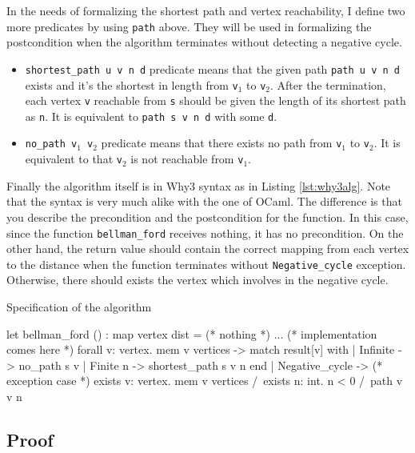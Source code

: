 \documentclass[a4paper,12pt]{article}
\begin{document}
In the needs of formalizing the shortest path and vertex reachability,
I define two more predicates by using \texttt{path} above. They will
be used in formalizing the postcondition when the algorithm terminates
without detecting a negative cycle.

\begin{itemize}

\item \texttt{shortest\_path u v n d} predicate means that the given
  path \texttt{path u v n d} exists and it's the shortest in length
  from \texttt{v$_1$} to \texttt{v$_2$}. After the termination, each
  vertex \texttt{v} reachable from \texttt{s} should be given the
  length of its shortest path as \texttt{n}. It is equivalent to
  \texttt{path s v n d} with some \texttt{d}.

\item \texttt{no\_path v$_1$ v$_2$} predicate means that there exists
  no path from \texttt{v$_1$} to \texttt{v$_2$}. It is equivalent to
  that \texttt{v$_2$} is not reachable from \texttt{v$_1$}.

\end{itemize}

Finally the algorithm itself is in Why3 syntax as in Listing
\ref{lst:why3alg}. Note that the syntax is very much alike with the
one of OCaml. The difference is that you describe the precondition and
the postcondition for the function. In this case, since the function
\texttt{bellman\_ford} receives nothing, it has no precondition. On
the other hand, the return value should contain the correct mapping
from each vertex to the distance when the function terminates without
\texttt{Negative\_cycle} exception. Otherwise, there should exists the
vertex which involves in the negative cycle.

\begin{algorithm}
\caption{Specification of the algorithm}\label{lst:why3alg}
\begin{why3}
let bellman_ford () : map vertex dist =
  { (* nothing *) }
  ... (* implementation comes here *)
  { forall v: vertex. mem v vertices ->
    match result[v] with
    | Infinite -> no_path s v
    | Finite n -> shortest_path s v n
    end }
  | Negative_cycle -> (* exception case *)
  { exists v: vertex. mem v vertices /\
    exists n: int. n < 0 /\ path v v n }
\end{why3}
\end{algorithm}

\subsection{Proof}
\end{document}
